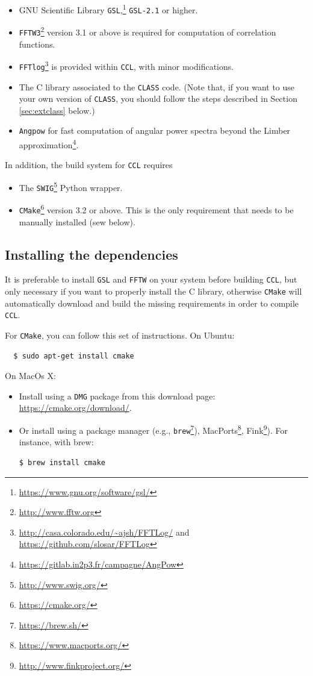 \documentclass[\docopts]{\docclass}
\newcommand{\ccl}{{\tt CCL}\xspace}
\begin{document}
\begin{itemize}
\item GNU Scientific Library {\tt GSL},\footnote{\url{https://www.gnu.org/software/gsl/}} {\tt GSL-2.1} or higher.
\item {\tt FFTW3}\footnote{\url{http://www.fftw.org}} version 3.1 or above is required for computation of correlation functions.
\item {\tt FFTlog}\footnote{\url{http://casa.colorado.edu/~ajsh/FFTLog/} and \url{https://github.com/slosar/FFTLog}} is provided within \ccl, with minor modifications.
\item The C library associated to the {\tt CLASS} code. (Note that, if you want to use your own version of {\tt CLASS}, you should follow the steps described in Section \ref{sec:extclass} below.)
  \item {\tt Angpow} \citep{2017arXiv170103592C} for fast computation of angular power spectra beyond the Limber approximation\footnote{\url{https://gitlab.in2p3.fr/campagne/AngPow}}.
\end{itemize}

In addition, the build system for \ccl requires
\begin{itemize}
\item The {\tt SWIG}\footnote{\url{http://www.swig.org/}} Python wrapper.
\item {\tt CMake}\footnote{\url{https://cmake.org/}} version 3.2 or above. This is the only requirement that needs to be manually installed (sew below).
\end{itemize}

\subsection{Installing the dependencies}

It is preferable to install {\tt GSL} and {\tt FFTW} on your system before building \ccl, but only necessary if you want to properly install the C library, otherwise {\tt CMake} will automatically download and build the missing requirements in order to compile \ccl.

For {\tt CMake}, you can follow this set of instructions. On Ubuntu:
\begin{verbatim}
  $ sudo apt-get install cmake
\end{verbatim}
 On MacOs X:
\begin{itemize}
 \item Install using a {\tt DMG} package from this download page: \url{https://cmake.org/download/}.
 \item Or install using a package manager (e.g., {\tt brew}\footnote{\url{https://brew.sh/}}), MacPorts\footnote{\url{https://www.macports.org/}}, Fink\footnote{\url{http://www.finkproject.org/}}). For instance, with brew:
\begin{verbatim}
$ brew install cmake
\end{verbatim}
\end{itemize}
\end{document}
